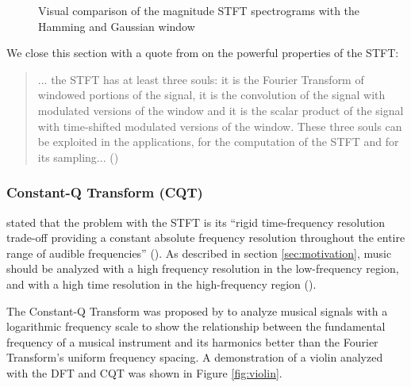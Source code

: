 \documentclass[report.tex]{subfiles}
\begin{document}
\begin{figure}[ht]
	\hspace{0.1em}
	\caption{Visual comparison of the magnitude STFT spectrograms with the Hamming and Gaussian window}
	\label{fig:stfts}
\end{figure}

We close this section with a quote from \citeauthor{doerflersouls} on the powerful properties of the STFT:

\begin{quote}
	... the STFT has at least three souls: it is the Fourier Transform of windowed portions of the signal, it is the convolution of the signal with modulated versions of the window and it is the scalar product of the signal with time-shifted modulated versions of the window. These three souls can be exploited in the applications, for the computation of the STFT and for its sampling... (\cite[96]{doerflersouls})
\end{quote}

\newpagefill

\subsubsection{Constant-Q Transform (CQT)}
\label{sec:cqt}

\citeauthor{cqtransient} stated that the problem with the STFT is its ``rigid time-frequency resolution trade-off providing a constant absolute frequency resolution throughout the entire range of audible frequencies'' (\cite[1]{cqtransient}). As described in section \ref{sec:motivation}, music should be analyzed with a high frequency resolution in the low-frequency region, and with a high time resolution in the high-frequency region (\cite{doerflerphd, cqtransient}). 

The Constant-Q Transform was proposed by \textcite{jbrown, msp} to analyze musical signals with a logarithmic frequency scale to show the relationship between the fundamental frequency of a musical instrument and its harmonics better than the Fourier Transform's uniform frequency spacing. A demonstration of a violin analyzed with the DFT and CQT was shown in Figure \ref{fig:violin}.
\end{document}
